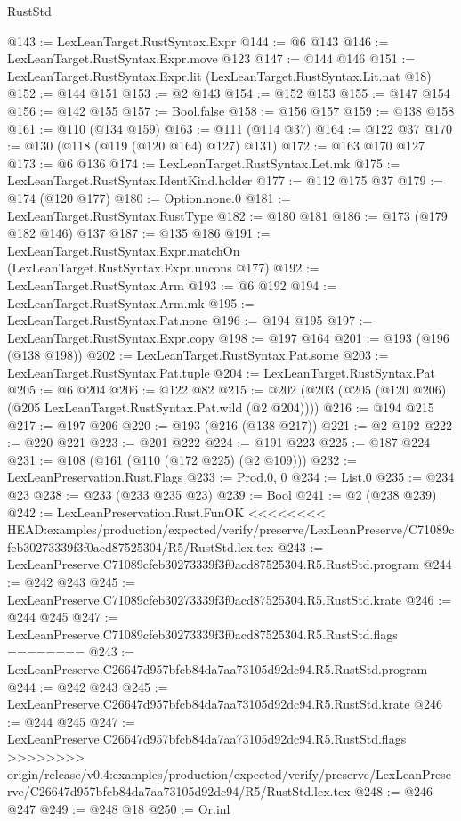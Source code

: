 \begin{lexlean}{RustStd}
\begin{coremodule}
{\begin{coremodule}
{{{{{{@143 := LexLeanTarget.RustSyntax.Expr
@144 := @6 @143
@146 := LexLeanTarget.RustSyntax.Expr.move @123
@147 := @144 @146
@151 := LexLeanTarget.RustSyntax.Expr.lit (LexLeanTarget.RustSyntax.Lit.nat @18)
@152 := @144 @151
@153 := @2 @143
@154 := @152 @153
@155 := @147 @154
@156 := @142 @155
@157 := Bool.false
@158 := @156 @157
@159 := @138 @158
@161 := @110 (@134 @159)
@163 := @111 (@114 @37)
@164 := @122 @37
@170 := @130 (@118 (@119 (@120 @164) @127) @131)
@172 := @163 @170 @127
@173 := @6 @136
@174 := LexLeanTarget.RustSyntax.Let.mk
@175 := LexLeanTarget.RustSyntax.IdentKind.holder
@177 := @112 @175 @37
@179 := @174 (@120 @177)
@180 := Option.none.{0}
@181 := LexLeanTarget.RustSyntax.RustType
@182 := @180 @181
@186 := @173 (@179 @182 @146) @137
@187 := @135 @186
@191 := LexLeanTarget.RustSyntax.Expr.matchOn (LexLeanTarget.RustSyntax.Expr.uncons @177)
@192 := LexLeanTarget.RustSyntax.Arm
@193 := @6 @192
@194 := LexLeanTarget.RustSyntax.Arm.mk
@195 := LexLeanTarget.RustSyntax.Pat.none
@196 := @194 @195
@197 := LexLeanTarget.RustSyntax.Expr.copy
@198 := @197 @164
@201 := @193 (@196 (@138 @198))
@202 := LexLeanTarget.RustSyntax.Pat.some
@203 := LexLeanTarget.RustSyntax.Pat.tuple
@204 := LexLeanTarget.RustSyntax.Pat
@205 := @6 @204
@206 := @122 @82
@215 := @202 (@203 (@205 (@120 @206) (@205 LexLeanTarget.RustSyntax.Pat.wild (@2 @204))))
@216 := @194 @215
@217 := @197 @206
@220 := @193 (@216 (@138 @217))
@221 := @2 @192
@222 := @220 @221
@223 := @201 @222
@224 := @191 @223
@225 := @187 @224
@231 := @108 (@161 (@110 (@172 @225) (@2 @109)))
@232 := LexLeanPreservation.Rust.Flags
@233 := Prod.{0, 0}
@234 := List.{0}
@235 := @234 @23
@238 := @233 (@233 @235 @23)
@239 := Bool
@241 := @2 (@238 @239)
@242 := LexLeanPreservation.Rust.FunOK
<<<<<<<< HEAD:examples/production/expected/verify/preserve/LexLeanPreserve/C71089cfeb30273339f3f0acd87525304/R5/RustStd.lex.tex
@243 := LexLeanPreserve.C71089cfeb30273339f3f0acd87525304.R5.RustStd.program
@244 := @242 @243
@245 := LexLeanPreserve.C71089cfeb30273339f3f0acd87525304.R5.RustStd.krate
@246 := @244 @245
@247 := LexLeanPreserve.C71089cfeb30273339f3f0acd87525304.R5.RustStd.flags
========
@243 := LexLeanPreserve.C26647d957bfcb84da7aa73105d92dc94.R5.RustStd.program
@244 := @242 @243
@245 := LexLeanPreserve.C26647d957bfcb84da7aa73105d92dc94.R5.RustStd.krate
@246 := @244 @245
@247 := LexLeanPreserve.C26647d957bfcb84da7aa73105d92dc94.R5.RustStd.flags
>>>>>>>> origin/release/v0.4:examples/production/expected/verify/preserve/LexLeanPreserve/C26647d957bfcb84da7aa73105d92dc94/R5/RustStd.lex.tex
@248 := @246 @247
@249 := @248 @18
@250 := Or.inl
}}}}}}
\end{coremodule}}
\end{coremodule}
\end{lexlean}
